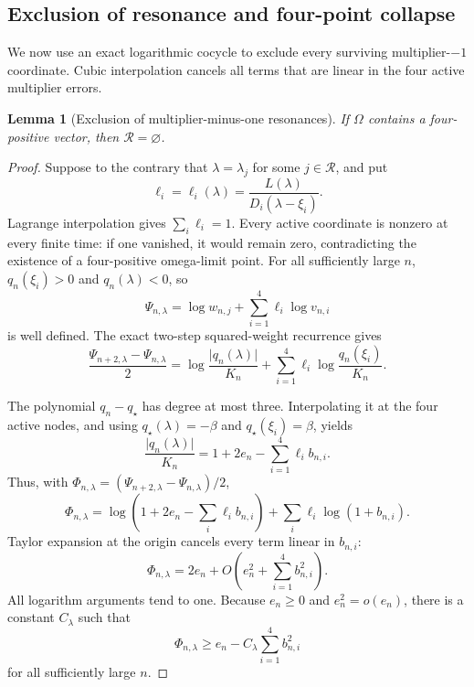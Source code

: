 \documentclass[11pt]{article}
\newtheorem{lemma}{Lemma}[section]
\begin{document}
\subsection{Exclusion of resonance and four-point collapse}

We now use an exact logarithmic cocycle to exclude every surviving
multiplier-\(-1\) coordinate.  Cubic interpolation cancels all terms that
are linear in the four active multiplier errors.

\begin{lemma}[Exclusion of multiplier-minus-one resonances]
\label{lem:no-surviving-resonance}
If \(\Omega\) contains a four-positive vector, then
\(\mathcal R=\varnothing\).
\end{lemma}

\begin{proof}
Suppose to the contrary that \(\lambda=\lambda_j\) for some
\(j\in\mathcal R\), and put
\[
 \ell_i=\ell_i(\lambda)
 =\frac{L(\lambda)}{D_i(\lambda-\xi_i)}.
\]
Lagrange interpolation gives \(\sum_i\ell_i=1\).  Every active coordinate
is nonzero at every finite time: if one vanished, it would remain zero,
contradicting the existence of a four-positive omega-limit point.  For all
sufficiently large \(n\), \(q_n(\xi_i)>0\) and \(q_n(\lambda)<0\), so
\[
 \Psi_{n,\lambda}
 =\log w_{n,j}+\sum_{i=1}^4\ell_i\log v_{n,i}
\tag{58}\label{eq:Psi}
\]
is well defined.  The exact two-step squared-weight recurrence gives
\[
 \frac{\Psi_{n+2,\lambda}-\Psi_{n,\lambda}}2
 =
 \log\frac{\lvert q_n(\lambda)\rvert}{K_n}
 +\sum_{i=1}^4\ell_i
     \log\frac{q_n(\xi_i)}{K_n}.
\tag{59}\label{eq:Psi-half}
\]

The polynomial \(q_n-q_\star\) has degree at most three.  Interpolating it
at the four active nodes, and using
\(q_\star(\lambda)=-\beta\) and
\(q_\star(\xi_i)=\beta\), yields
\[
 \frac{\lvert q_n(\lambda)\rvert}{K_n}
 =1+2e_n-\sum_{i=1}^4\ell_i b_{n,i}.
\tag{60}\label{eq:resonant-interpolation}
\]
Thus, with
\(\Phi_{n,\lambda}=(\Psi_{n+2,\lambda}-\Psi_{n,\lambda})/2\),
\[
 \Phi_{n,\lambda}
 =
 \log\left(1+2e_n-\sum_i\ell_i b_{n,i}\right)
 +\sum_i\ell_i\log(1+b_{n,i}).
\tag{61}\label{eq:Phi-exact}
\]
Taylor expansion at the origin cancels every term linear in \(b_{n,i}\):
\[
 \Phi_{n,\lambda}
 =2e_n+O\left(e_n^2+\sum_{i=1}^4b_{n,i}^2\right).
\tag{62}\label{eq:Phi-Taylor}
\]
All logarithm arguments tend to one.  Because \(e_n\geq0\) and
\(e_n^2=o(e_n)\), there is a constant \(C_\lambda\) such that
\[
 \Phi_{n,\lambda}
 \geq e_n-C_\lambda\sum_{i=1}^4b_{n,i}^2
\tag{63}\label{eq:Phi-lower}
\]
for all sufficiently large \(n\).


\end{proof}
\end{document}
